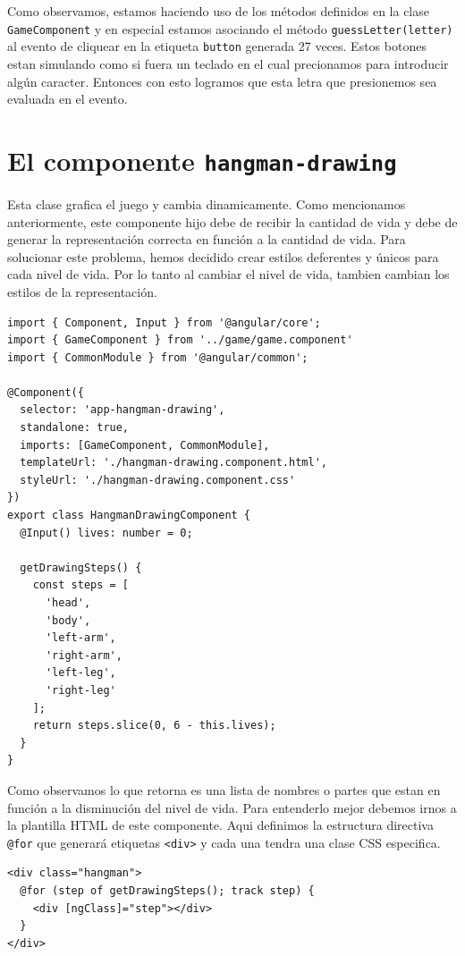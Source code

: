 \documentclass[10pt, a4paper]{article}
\newcommand{\mts}[1]{\texttt{#1}}
\begin{document}
Como observamos, estamos haciendo uso de los métodos definidos en la clase \mts{GameComponent} y en especial estamos asociando el método \mts{guessLetter(letter)} al evento de cliquear en la etiqueta \mts{button} generada 27 veces.
\singlespacing
Estos botones estan simulando como si fuera un teclado en el cual precionamos para introducir algún caracter. Entonces con esto logramos que esta letra que presionemos sea evaluada en el evento.

\section{El componente \mts{hangman-drawing}}
Esta clase grafica el juego y cambia dinamicamente. Como mencionamos anteriormente, este componente hijo debe de recibir la cantidad de vida y debe de generar la representación correcta en función a la cantidad de vida.
\singlespacing
Para solucionar este problema, hemos decidido crear estilos deferentes y únicos para cada nivel de vida. Por lo tanto al cambiar el nivel de vida, tambien cambian los estilos de la representación.

\begin{verbatim}
import { Component, Input } from '@angular/core';
import { GameComponent } from '../game/game.component'
import { CommonModule } from '@angular/common';

@Component({
  selector: 'app-hangman-drawing',
  standalone: true,
  imports: [GameComponent, CommonModule],
  templateUrl: './hangman-drawing.component.html',
  styleUrl: './hangman-drawing.component.css'
})
export class HangmanDrawingComponent {
  @Input() lives: number = 0;

  getDrawingSteps() {
    const steps = [
      'head',
      'body',
      'left-arm',
      'right-arm',
      'left-leg',
      'right-leg'
    ];
    return steps.slice(0, 6 - this.lives);
  }
}
\end{verbatim}

Como observamos lo que retorna es una lista de nombres o partes que estan en función a la disminución del nivel de vida. Para entenderlo mejor debemos irnos a la plantilla HTML de este componente. Aqui definimos la estructura directiva \mts{@for} que generará etiquetas \mts{<div>} y cada una tendra una clase CSS especifica.

\begin{verbatim}
<div class="hangman">
  @for (step of getDrawingSteps(); track step) {
    <div [ngClass]="step"></div>
  }
</div>
\end{verbatim}
\end{document}
